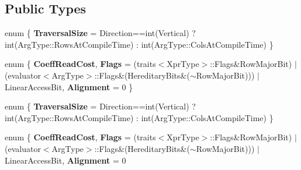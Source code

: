 \subsection*{Public Types}
\begin{DoxyCompactItemize}
\item 
\mbox{\label{struct_eigen_1_1internal_1_1evaluator_3_01_partial_redux_expr_3_01_arg_type_00_01_member_op_00_01_direction_01_4_01_4_a79849cb6f2681cfc327992eb02b3c357}} 
enum \{ {\bfseries Traversal\+Size} = Direction==int(Vertical) ? int(Arg\+Type\+:\+:Rows\+At\+Compile\+Time) \+: int(Arg\+Type\+:\+:Cols\+At\+Compile\+Time)
 \}
\item 
\mbox{\label{struct_eigen_1_1internal_1_1evaluator_3_01_partial_redux_expr_3_01_arg_type_00_01_member_op_00_01_direction_01_4_01_4_a9ac790c776fc0385342df0a8a694a7d8}} 
enum \{ {\bfseries Coeff\+Read\+Cost}, 
{\bfseries Flags} = (traits$<$Xpr\+Type$>$\+:\+:Flags\&Row\+Major\+Bit) $\vert$ (evaluator$<$Arg\+Type$>$\+:\+:Flags\&(Hereditary\+Bits\&($\sim$\+Row\+Major\+Bit))) $\vert$ Linear\+Access\+Bit, 
{\bfseries Alignment} = 0
 \}
\item 
\mbox{\label{struct_eigen_1_1internal_1_1evaluator_3_01_partial_redux_expr_3_01_arg_type_00_01_member_op_00_01_direction_01_4_01_4_ae128e6263e21d3e89ab71a6736898e44}} 
enum \{ {\bfseries Traversal\+Size} = Direction==int(Vertical) ? int(Arg\+Type\+:\+:Rows\+At\+Compile\+Time) \+: int(Arg\+Type\+:\+:Cols\+At\+Compile\+Time)
 \}
\item 
\mbox{\label{struct_eigen_1_1internal_1_1evaluator_3_01_partial_redux_expr_3_01_arg_type_00_01_member_op_00_01_direction_01_4_01_4_abdf224eef1ca02520263ad36baffa54a}} 
enum \{ {\bfseries Coeff\+Read\+Cost}, 
{\bfseries Flags} = (traits$<$Xpr\+Type$>$\+:\+:Flags\&Row\+Major\+Bit) $\vert$ (evaluator$<$Arg\+Type$>$\+:\+:Flags\&(Hereditary\+Bits\&($\sim$\+Row\+Major\+Bit))) $\vert$ Linear\+Access\+Bit, 
{\bfseries Alignment} = 0

\end{DoxyCompactItemize}
